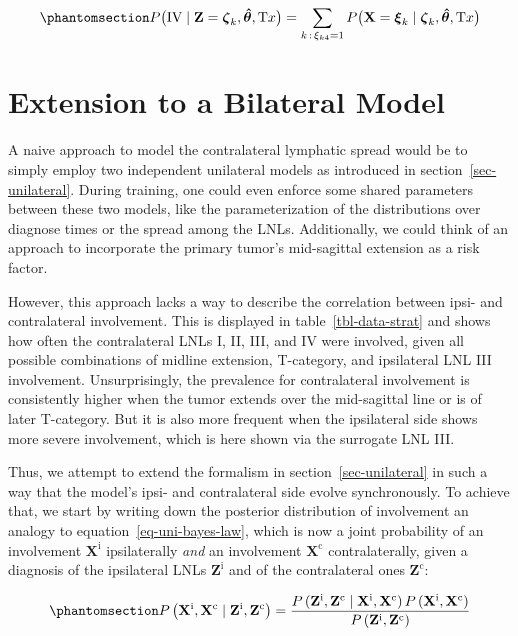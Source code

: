 \documentclass[
  sn-mathphys-num,
]{sn-jnl}
\begin{document}
\begin{equation}\phantomsection\label{eq-marg-over-posterior}{
P \big( \text{IV} \mid \mathbf{Z}=\boldsymbol{\zeta}_k, \boldsymbol{\hat{\theta}}, \text{T}x  \big) = \sum_{k \, : \, \xi_{k4}=1} P \big( \mathbf{X} = \boldsymbol{\xi}_k \mid \boldsymbol{\zeta}_k, \boldsymbol{\hat{\theta}}, \text{T}x  \big)
}\end{equation}

\section{Extension to a Bilateral Model}\label{sec-ext-to-contra}

A naive approach to model the contralateral lymphatic spread would be to
simply employ two independent unilateral models as introduced in
section~\ref{sec-unilateral}. During training, one could even enforce
some shared parameters between these two models, like the
parameterization of the distributions over diagnose times or the spread
among the LNLs. Additionally, we could think of an approach to
incorporate the primary tumor's mid-sagittal extension as a risk factor.

However, this approach lacks a way to describe the correlation between
ipsi- and contralateral involvement. This is displayed in
table~\ref{tbl-data-strat} and shows how often the contralateral LNLs I,
II, III, and IV were involved, given all possible combinations of
midline extension, T-category, and ipsilateral LNL III involvement.
Unsurprisingly, the prevalence for contralateral involvement is
consistently higher when the tumor extends over the mid-sagittal line or
is of later T-category. But it is also more frequent when the
ipsilateral side shows more severe involvement, which is here shown via
the surrogate LNL III.

Thus, we attempt to extend the formalism in section~\ref{sec-unilateral}
in such a way that the model's ipsi- and contralateral side evolve
synchronously. To achieve that, we start by writing down the posterior
distribution of involvement an analogy to
equation~\ref{eq-uni-bayes-law}, which is now a joint probability of an
involvement \(\mathbf{X}^\text{i}\) ipsilaterally \emph{and} an
involvement \(\mathbf{X}^\text{c}\) contralaterally, given a diagnosis
of the ipsilateral LNLs \(\mathbf{Z}^\text{i}\) and of the contralateral
ones \(\mathbf{Z}^\text{c}\):

\begin{equation}\phantomsection\label{eq-bilateral-bayes}{
P \left( \mathbf{X}^\text{i}, \mathbf{X}^\text{c} \mid \mathbf{Z}^\text{i}, \mathbf{Z}^\text{c} \right) = \frac{P \left( \mathbf{Z}^\text{i}, \mathbf{Z}^\text{c} \mid \mathbf{X}^\text{i}, \mathbf{X}^\text{c} \right) P \left( \mathbf{X}^\text{i}, \mathbf{X}^\text{c} \right)}{P \left( \mathbf{Z}^\text{i}, \mathbf{Z}^\text{c} \right)}
}\end{equation}
\end{document}
